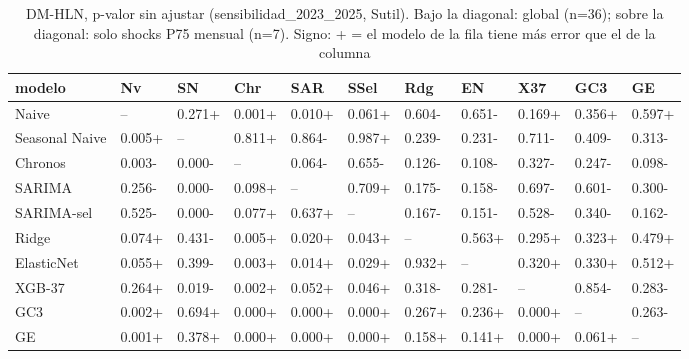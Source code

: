 \begin{table}[H]
\centering
\small
\caption{DM-HLN, p-valor sin ajustar (sensibilidad\_2023\_2025, Sutil). Bajo la diagonal: global (n=36); sobre la diagonal: solo shocks P75 mensual (n=7). Signo: + = el modelo de la fila tiene más error que el de la columna}
\label{tab:T09_DM_matriz_sensibilidad_2023_2025_sutil}
\begin{tabular}{lllllllllll}
\toprule
modelo & Nv & SN & Chr & SAR & SSel & Rdg & EN & X37 & GC3 & GE \\
\midrule
Naive & -- & 0.271+ & 0.001+ & 0.010+ & 0.061+ & 0.604- & 0.651- & 0.169+ & 0.356+ & 0.597+ \\
Seasonal Naive & 0.005+ & -- & 0.811+ & 0.864- & 0.987+ & 0.239- & 0.231- & 0.711- & 0.409- & 0.313- \\
Chronos & 0.003- & 0.000- & -- & 0.064- & 0.655- & 0.126- & 0.108- & 0.327- & 0.247- & 0.098- \\
SARIMA & 0.256- & 0.000- & 0.098+ & -- & 0.709+ & 0.175- & 0.158- & 0.697- & 0.601- & 0.300- \\
SARIMA-sel & 0.525- & 0.000- & 0.077+ & 0.637+ & -- & 0.167- & 0.151- & 0.528- & 0.340- & 0.162- \\
Ridge & 0.074+ & 0.431- & 0.005+ & 0.020+ & 0.043+ & -- & 0.563+ & 0.295+ & 0.323+ & 0.479+ \\
ElasticNet & 0.055+ & 0.399- & 0.003+ & 0.014+ & 0.029+ & 0.932+ & -- & 0.320+ & 0.330+ & 0.512+ \\
XGB-37 & 0.264+ & 0.019- & 0.002+ & 0.052+ & 0.046+ & 0.318- & 0.281- & -- & 0.854- & 0.283- \\
GC3 & 0.002+ & 0.694+ & 0.000+ & 0.000+ & 0.000+ & 0.267+ & 0.236+ & 0.000+ & -- & 0.263- \\
GE & 0.001+ & 0.378+ & 0.000+ & 0.000+ & 0.000+ & 0.158+ & 0.141+ & 0.000+ & 0.061+ & -- \\
\bottomrule
\end{tabular}
\end{table}
